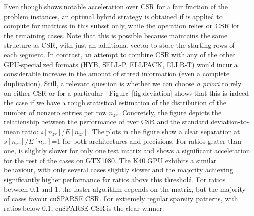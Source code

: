 Even though \bcsr shows notable acceleration over CSR
for a fair fraction of the problem instances,
an optimal hybrid strategy is obtained if \bcsr is applied to compute \spmv
for matrices in this subset only,
while the operation relies on CSR for the remaining cases.
Note that this is possible because \bcsr maintains the same structure as CSR,
with just an additional vector to store the starting rows of each segment.
In contrast, an attempt to combine CSR with any
of the other GPU-specialized formats (HYB, SELL-P, ELLPACK, ELLR-T)
would incur a considerable increase in the amount
of stored information (even a complete duplication).
Still, a relevant question is whether we can choose {\em a priori}
to rely on either CSR or \bcsr for a particular \spmv.
Figure~\ref{fig:deviation} shows that this is indeed the case
if we have a rough statistical estimation
of the distribution of the number of nonzero entries per row $n_{zr}$.
Concretely, the figure depicts the relationship
between the performance of \bcsr over CSR
and the standard deviation-to-mean ratio:
$s[n_{zr}]/E[n_{zr}]$.
The plots in the figure show a clear separation at
$s[n_{zr}]/E[n_{zr}]$=1 for both architectures and precisions.
For ratios grater than one, \bcsr is slightly slower for only one test matrix
and shows a significant acceleration for the rest of the cases on GTX1080.
The K40 GPU exhibits a similar behaviour,
with only several cases slightly slower and the majority
achieving significantly higher performance for ratios above this threshold.
For ratios between 0.1 and 1, the faster algorithm
depends on the matrix, but the majority of cases favour cuSPARSE CSR.
For extremely regular sparsity patterns, with ratios below 0.1,
cuSPARSE CSR is the clear winner.
